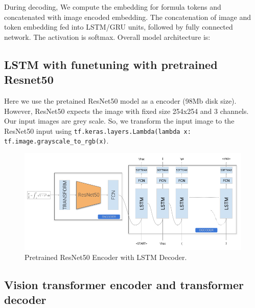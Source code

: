 \documentclass{article}
\begin{document}
During decoding, We compute the embedding for formula tokens and concatenated with image encoded embedding. The concatenation of image and token embedding fed into LSTM/GRU units, followed by fully connected network. The activation is softmax.  Overall model architecture is: 

\subsection{LSTM with funetuning with pretrained Resnet50}

Here we use the pretained ResNet50 model as a encoder (98Mb disk size). However, ResNet50 expects the image with fixed size 254x254 and 3 channels. Our input images are grey scale. So, we transform the input image to the ResNet50 input using \verb|tf.keras.layers.Lambda(lambda x: tf.image.grayscale_to_rgb(x)|.


\begin{figure}[H]
    \centering
    \includegraphics[scale=0.3]{fig_resnet_LSTM.png}
    \caption{Pretrained ResNet50 Encoder with LSTM Decoder.}
    \label{fig:resnet_lstm}
\end{figure}

\subsection{Vision transformer encoder and transformer decoder}
\end{document}
